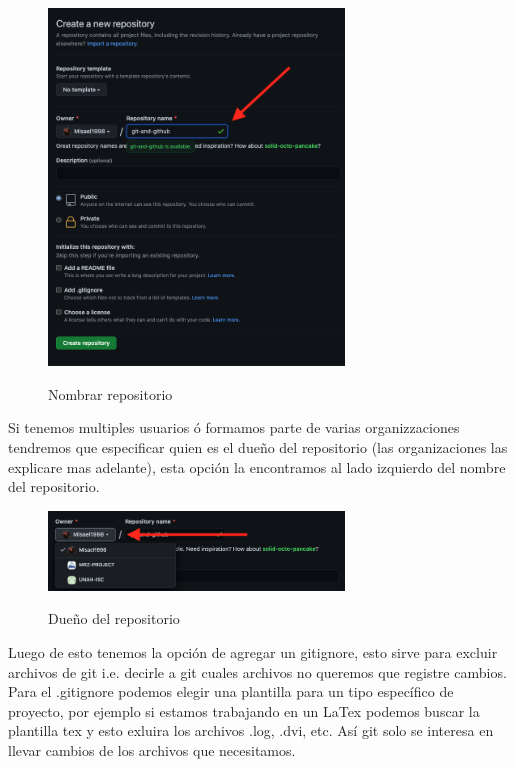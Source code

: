 \documentclass[11pt, oneside]{article}
\begin{document}
\begin{figure}[H]
  \centering
  \caption{Nombrar repositorio}
  \includegraphics[width=0.70\textwidth]{./img/github-new-repo-2.png}
  \label{fig:github-new-repo-2}
\end{figure}

Si tenemos multiples usuarios ó formamos parte de varias organizzaciones tendremos que especificar quien es el dueño del repositorio (las organizaciones las explicare mas adelante), esta opción la encontramos al lado izquierdo del nombre del repositorio.

\begin{figure}[H]
  \centering
  \caption{Dueño del repositorio}
  \includegraphics[width=0.70\textwidth]{./img/github-new-repo-3.png}
  \label{fig:github-new-repo-3}
\end{figure}

Luego de esto tenemos la opción de agregar un gitignore, esto sirve para excluir archivos de git i.e. decirle a git cuales archivos no queremos que registre cambios. Para el .gitignore podemos elegir una plantilla para un tipo específico de proyecto, por ejemplo si estamos trabajando en un LaTex podemos buscar la plantilla tex y esto exluira los archivos .log, .dvi, etc. Así git solo se interesa en llevar cambios de los archivos que necesitamos.
\end{document}
